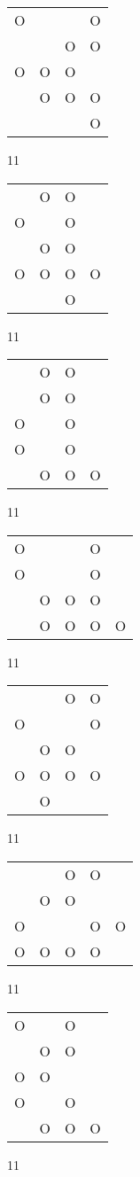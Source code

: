 \begin{tabular}{|m{0.2cm}m{0.2cm}m{0.2cm}m{0.2cm}|}\hline
O& & &O\\
 & &O&O\\
O&O&O& \\
 &O&O&O\\
 & & &O\\
\hline\end{tabular}11
\begin{tabular}{|m{0.2cm}m{0.2cm}m{0.2cm}m{0.2cm}|}\hline
 &O&O& \\
O& &O& \\
 &O&O& \\
O&O&O&O\\
 & &O& \\
\hline\end{tabular}11
\begin{tabular}{|m{0.2cm}m{0.2cm}m{0.2cm}m{0.2cm}|}\hline
 &O&O& \\
 &O&O& \\
O& &O& \\
O& &O& \\
 &O&O&O\\
\hline\end{tabular}11
\begin{tabular}{|m{0.2cm}m{0.2cm}m{0.2cm}m{0.2cm}m{0.2cm}|}\hline
O& & &O& \\
O& & &O& \\
 &O&O&O& \\
 &O&O&O&O\\
\hline\end{tabular}11
\begin{tabular}{|m{0.2cm}m{0.2cm}m{0.2cm}m{0.2cm}|}\hline
 & &O&O\\
O& & &O\\
 &O&O& \\
O&O&O&O\\
 &O& & \\
\hline\end{tabular}11
\begin{tabular}{|m{0.2cm}m{0.2cm}m{0.2cm}m{0.2cm}m{0.2cm}|}\hline
 & &O&O& \\
 &O&O& & \\
O& & &O&O\\
O&O&O&O& \\
\hline\end{tabular}11
\begin{tabular}{|m{0.2cm}m{0.2cm}m{0.2cm}m{0.2cm}|}\hline
O& &O& \\
 &O&O& \\
O&O& & \\
O& &O& \\
 &O&O&O\\
\hline\end{tabular}11
